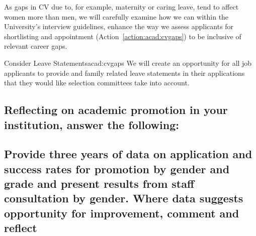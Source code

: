 As gaps in CV due to, for example, maternity or caring leave, tend to affect women more than men, we will carefully examine how we can within the University's interview guidelines, enhance the way we assess applicants for shortlisting and appointment (Action~\ref{action:acad:cvgaps}) to be inclusive of relevant career gaps.

\newcommand{\actacadcvgaps}{%
We will create an opportunity for all job applicants to provide \todo{Covid-19} and family related leave statements in their applications that they would like selection committees take into account.
}
\begin{actionblock}{\ksspace{}Consider Leave Statements}{acad:cvgaps}
\actacadcvgaps 
\hfill{
    \hypersetup{hidelinks}
    \hyperlink{c6}{\gotoactionsymbol{}}
}
\end{actionblock}




\subsection{Reflecting on academic promotion in your institution, answer the following: }



\subsection{Provide three years of data on application and success rates for promotion by gender and grade and present results from staff consultation by gender. Where data suggests opportunity for improvement, comment and reflect}

